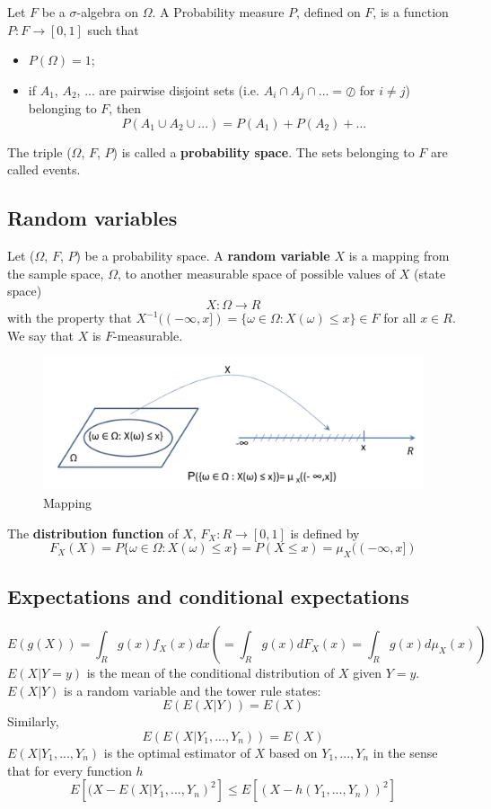 \documentclass[11pt,a4paper]{book}
\theoremstyle{definition}\newtheorem{definition}{Definition}
\theoremstyle{definition}\newtheorem{fact}{Fact}
\theoremstyle{definition}\newtheorem{remark}{Remark}
\theoremstyle{definition}\newtheorem{ex}{Ex.}
\theoremstyle{definition}\newtheorem{project}{Project}
\theoremstyle{definition}\newtheorem{problem}{Problem}
\theoremstyle{definition}\newtheorem{example}{Example}
\numberwithin{theorem}{section}
\numberwithin{corollary}{chapter}
\numberwithin{assumption}{chapter}
\numberwithin{definition}{chapter}
\numberwithin{prop}{chapter}
\numberwithin{notation}{chapter}
\numberwithin{problem}{chapter}
\numberwithin{example}{chapter}
\numberwithin{fact}{chapter}
\numberwithin{ex}{chapter}
\begin{document}
Let $F$ be a $\sigma$-algebra on $\Omega$. A Probability measure $P$, defined on $F$, is a function $P : F \rightarrow [0,1]$ such that
\begin{itemize}
\item $P(\Omega) = 1$;
\item if $A_1$, $A_2$, ... are pairwise disjoint sets (i.e. $A_i \cap A_j \cap ... = \oslash$ for $i \neq j$) belonging to $F$, then
$$P(A_1 \cup A_2 \cup ...)  = P(A_1) + P(A_2) + ...$$
\end{itemize}

The triple ($\Omega$, $F$, $P$) is called a \textbf{probability space}. The sets belonging to $F$ are called events.

\subsection{Random variables}
Let ($\Omega$, $F$, $P$) be a probability space. A \textbf{random variable} $X$ is a mapping from the sample space, $\Omega$, to another measurable space of possible values of $X$ (state space)
$$ X : \Omega \rightarrow R$$
with the property that $X^{-1}((-\infty, x]) = \{\omega \in \Omega : X(\omega) \leq x\} \in F$ for all $x \in R$. We say that $X$ is $F$-measurable.

\begin{figure}[H]
	\centering
	\includegraphics[scale=0.5]{Chapter01/Chapter1_1.png}
	\caption{Mapping}
\end{figure}

The \textbf{distribution function} of $X$, $F_X : R \rightarrow [0,1]$ is defined by
$$ F_X(X) = P \{\omega \in \Omega : X(\omega) \leq x \} = P(X \leq x) = \mu_X((-\infty, x]) $$

\subsection{Expectations and conditional expectations}

$$E(g(X)) = \int_R g(x) f_X(x) dx  (= \int_R g(x) dF_X(x) = \int_R g(x) d\mu_X(x)) $$
$E(X | Y=y)$ is the mean of the conditional distribution of $X$ given $Y=y$.
$E(X | Y)$ is a random variable and the tower rule states:
$$E(E(X | Y)) = E(X)$$
Similarly,
$$E(E(X | Y_1,...,Y_n)) = E(X)$$
$E(X | Y_1,...,Y_n)$ is the optimal estimator of $X$ based on $Y_1,...,Y_n$ in the sense that for every function $h$
$$ E[ (X-E(X | Y_1,...,Y_n)^2 ] \leq E[ (X - h(Y_1,...,Y_n))^2 ] $$
\end{document}
